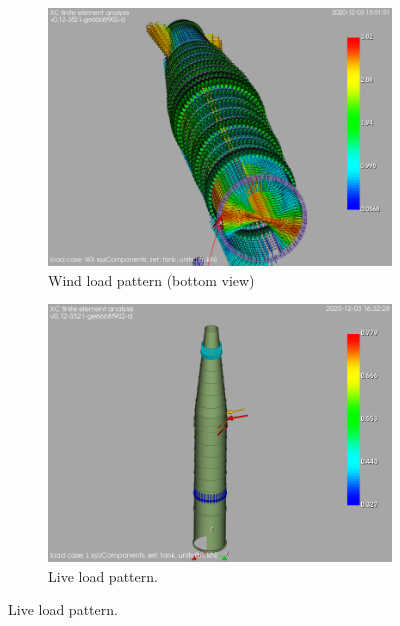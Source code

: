\documentclass[a4paper,11pt ]{xc_webpage_project}
\renewcommand{\widhtLeftCol}{0.475\textwidth} %
\renewcommand{\widhtRightCol}{0.475\textwidth} %
\begin{document}
\begin{figure}[h]
  \begin{subfigure}[b]{\widhtLeftCol}
  \centering
  \includegraphics[width=\textwidth]{figures/quencher_WX_unif_det}
  \caption{Wind load pattern (bottom view)}
  \end{subfigure}
\hfill
  \begin{subfigure}[b]{\widhtRightCol}
  \centering
  \includegraphics[width=\textwidth]{figures/quencher_L_point}
  \caption{ Live load pattern. }
  \end{subfigure}
  \end{figure}
\end{document}

